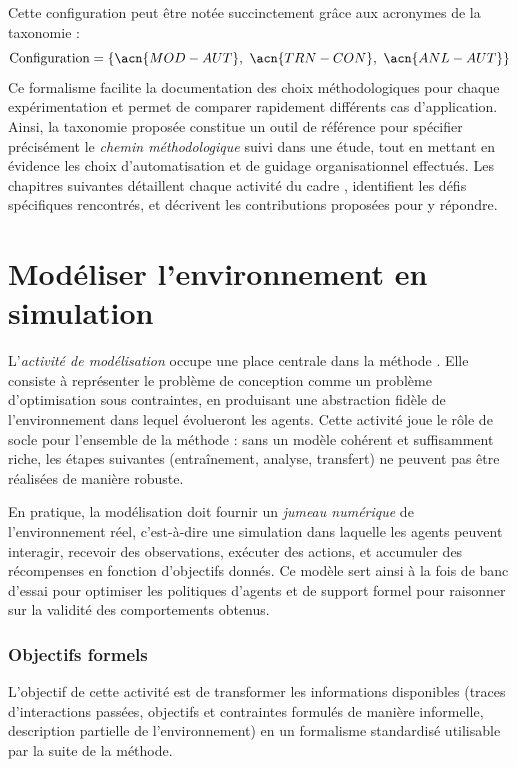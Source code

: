 Cette configuration peut être notée succinctement grâce aux acronymes de la taxonomie :
\[
    \text{Configuration} = \{\acn{MOD-AUT},\ \acn{TRN-CON},\ \acn{ANL-AUT}\}
\]
Ce formalisme facilite la documentation des choix méthodologiques pour chaque expérimentation et permet de comparer rapidement différents cas d'application.
%
Ainsi, la taxonomie proposée constitue un outil de référence pour spécifier précisément le \textit{chemin méthodologique} suivi dans une étude, tout en mettant en évidence les choix d'automatisation et de guidage organisationnel effectués.
Les chapitres suivantes détaillent chaque activité du cadre , identifient les défis spécifiques rencontrés, et décrivent les contributions proposées pour y répondre.


\clearpage
\thispagestyle{empty}
\null
\newpage


\chapter{Modéliser l'environnement en simulation}
\label{chap:modelling}

L'\textit{activité de modélisation} occupe une place centrale dans la méthode .
Elle consiste à représenter le problème de conception comme un problème d’optimisation sous contraintes, en produisant une abstraction fidèle de l’environnement dans lequel évolueront les agents.
Cette activité joue le rôle de socle pour l’ensemble de la méthode : sans un modèle cohérent et suffisamment riche, les étapes suivantes (entraînement, analyse, transfert) ne peuvent pas être réalisées de manière robuste.

En pratique, la modélisation doit fournir un \textit{jumeau numérique} de l’environnement réel, c’est-à-dire une simulation dans laquelle les agents peuvent interagir, recevoir des observations, exécuter des actions, et accumuler des récompenses en fonction d’objectifs donnés.
Ce modèle sert ainsi à la fois de banc d’essai pour optimiser les politiques d’agents et de support formel pour raisonner sur la validité des comportements obtenus.

\subsection*{Objectifs formels}
L’objectif de cette activité est de transformer les informations disponibles (traces d’interactions passées, objectifs et contraintes formulés de manière informelle, description partielle de l’environnement) en un formalisme standardisé utilisable par la suite de la méthode.


